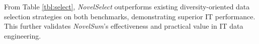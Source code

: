 \begin{table}[t!]
\centering
{}
\caption{Comparisons of different diversity-oriented data selection strategies on IT performance. $\mathcal{P}$ aggregates the performance based on Z-scores (Eq. \ref{eq:perf}).}
\label{tbl:select}
\vspace{-2mm}
\end{table}

From Table \ref{tbl:select}, \textit{NovelSelect} outperforms existing diversity-oriented data selection strategies on both benchmarks, demonstrating superior IT performance. This further validates \textit{NovelSum}'s effectiveness and practical value in IT data engineering.
